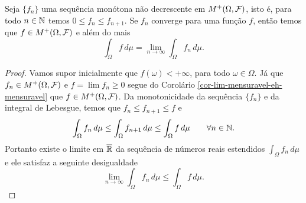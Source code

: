 \begin{teorema}
\label{Teo-Convergencia-Monótona}
Seja $\{f_n\}$ uma sequência monótona
não decrescente em 
$M^{+}(\Omega,\mathcal{F})$, isto é, 
para todo $n\in\mathbb{N}$ temos $0\leq f_n\leq f_{n+1}$.
Se $f_n$ converge para uma função $f$,
então temos que  $f\in M^{+}(\Omega,\mathcal{F})$ e
além do mais
	\[
	\int_{\Omega} f\, d\mu 
	=
	\lim_{n\to\infty}\int_{\Omega} f_n\, d\mu.
	\]
\end{teorema}



\begin{proof}
Vamos supor inicialmente que $f(\omega)<+\infty$,
para todo $\omega\in\Omega$. 
Já que $f_n\in M^{+}(\Omega,\mathcal{F})$ e $f=\lim f_n\geq 0$
segue do Corolário \ref{cor-lim-mensuravel-eh-mensuravel} 
que $f\in M^{+}(\Omega,\mathcal{F})$.
Da monotonicidade da sequência $\{f_n\}$ e da 
integral de Lebesgue, temos que 
$f_n\leq f_{n+1}\leq f$ e 
	\[
		\int_{\Omega} f_n\, d\mu 
		\leq
		\int_{\Omega} f_{n+1}\, d\mu
		\leq 
		\int_{\Omega} f\, d\mu
		\qquad
		\forall n\in\mathbb{N}.
	\] 
Portanto existe o limite em $\overline{\mathbb{R}}$ da
sequência de números reais estendidos $\int_{\Omega}f_n\, d\mu$ 
e ele satisfaz a seguinte desigualdade
	\begin{equation}\label{des-aux1-TCM}
		\lim_{n\to\infty} \int_{\Omega} f_n\, d\mu 
		\leq
		\int_{\Omega} f\, d\mu. 
	\end{equation}



\end{proof}
